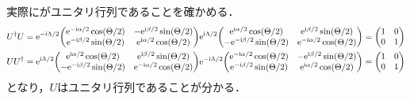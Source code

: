 \documentclass{report}
\begin{document}
    実際にがユニタリ行列であることを確かめる．
    \begin{align}
      U^{\dag}U &= \e^{-\i\Lambda/2}\mqty(
        \e^{-\i\alpha / 2}\cos(\Theta / 2) & -\e^{\i\beta / 2}\sin(\Theta / 2) \\ 
        \e^{-\i\beta / 2}\sin(\Theta / 2) & \e^{\i\alpha / 2}\cos(\Theta / 2)
      )
      \e^{\i\Lambda/2}\mqty(
        \e^{\i\alpha / 2}\cos(\Theta / 2) & \e^{\i\beta / 2}\sin(\Theta / 2) \\ 
        -\e^{-\i\beta / 2}\sin(\Theta / 2) & \e^{-\i\alpha / 2}\cos(\Theta / 2)
      )
      = \mqty(1 & 0 \\ 0 & 1) \\ 
      UU^{\dag} &= \e^{\i\Lambda/2}\mqty(
        \e^{\i\alpha / 2}\cos(\Theta / 2) & \e^{\i\beta / 2}\sin(\Theta / 2) \\ 
        -\e^{-\i\beta / 2}\sin(\Theta / 2) & \e^{-\i\alpha / 2}\cos(\Theta / 2)
      )
      \e^{-\i\Lambda/2}\mqty(
        \e^{-\i\alpha / 2}\cos(\Theta / 2) & -\e^{\i\beta / 2}\sin(\Theta / 2) \\ 
        \e^{-\i\beta / 2}\sin(\Theta / 2) & \e^{\i\alpha / 2}\cos(\Theta / 2)
      )
      = \mqty(1 & 0 \\ 0 & 1)
    \end{align}
    となり，$U$はユニタリ行列であることが分かる．
\end{document}
